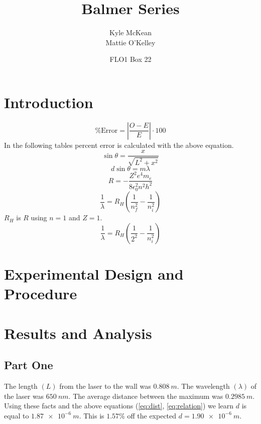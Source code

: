 \documentclass{article}
\title{Balmer Series}
\author{Kyle McKean \\ \normalsize Mattie O'Kelley}
\date{\normalsize FLO1 Box 22}
\newcommand{\pError}[0]{\ensuremath{\% \text{Error}}}
\newcommand{\foundGrating}[0]{\ensuremath{\num{1.87e-6} \: \si{m}}}
\newcommand{\givenGrating}[0]{\ensuremath{\num{1.90e-6} \: \si{m}}}
\begin{document}
\maketitle
\begin{abstract}
\lipsum[1-1]
\end{abstract}
\section{Introduction}
\begin{equation}
  \pError = \left| \frac{O - E}{E} \right| \cdot 100
\end{equation}
In the following tables percent error is calculated with the above equation. 
\begin{equation}
  \label{eq:dist}
  \sin{\theta} = \frac{x}{\sqrt{L^2 + x^2}}
\end{equation}
\begin{equation}
  \label{eq:relation}
  d \sin{\theta} = m \lambda
\end{equation}
\begin{equation}
  \label{eq:rydberg-1}
  R = - \frac{Z^2e^4m_e}{8\epsilon_0^2n^2h^2}
\end{equation}
\begin{equation}
  \label{eq:rydberg-2}
  \frac{1}{\lambda} = R_H \left( \frac{1}{n_f^2} - \frac{1}{n_i^2} \right)
\end{equation}
$R_H$ is $R$ using $n = 1$ and $Z = 1$.
\begin{equation}
  \label{eq:rydberg-3}
  \frac{1}{\lambda} = R_H \left( \frac{1}{2^2} - \frac{1}{n_i^2} \right)
\end{equation}

\section{Experimental Design and Procedure}
\lipsum[5-6]
\section{Results and Analysis}
\subsection{Part One}
The length $(L)$ from the laser to the wall was $0.808 \: \si{m}$.
The wavelength $(\lambda)$ of the laser was $650 \: \si{nm}$.
The average distance between the maximum was $0.2985 \: \si{m}$.
Using these facts and the above equations (\ref{eq:dist}, \ref{eq:relation})
we learn $d$ is equal to $\foundGrating$. This is $1.57\%$ off the expected
$d = \givenGrating$.
\end{document}
